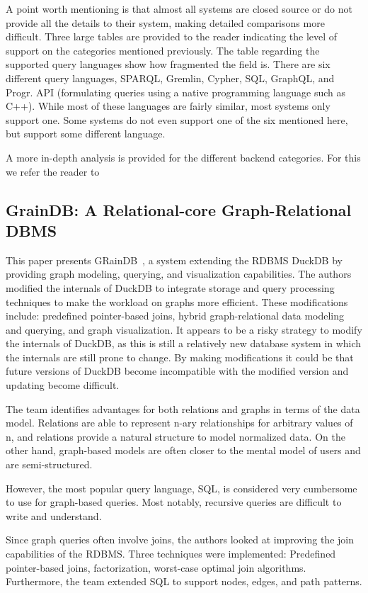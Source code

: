 A point worth mentioning is that almost all systems are closed source or do not provide all the details to their system, making detailed comparisons more difficult. Three large tables are provided to the reader indicating the level of support on the categories mentioned previously. The table regarding the supported query languages show how fragmented the field is. There are six different query languages, SPARQL, Gremlin, Cypher, SQL, GraphQL, and Progr. API (formulating queries using a native programming language such as C++). While most of these languages are fairly similar, most systems only support one. Some systems do not even support one of the six mentioned here, but support some different language.  

A more in-depth analysis is provided for the different backend categories. For this we refer the reader to 


\subsection{GrainDB: A Relational-core Graph-Relational DBMS}
This paper presents GRainDB~\cite{graindb}, a system extending the RDBMS DuckDB by providing graph modeling, querying, and visualization capabilities. The authors modified the internals of DuckDB  to integrate storage and query processing techniques  to make the workload on graphs more efficient. These modifications include: predefined pointer-based joins, hybrid graph-relational data modeling and querying, and graph visualization. It appears to be a risky strategy to modify the internals of DuckDB, as this is still a relatively new database system in which the internals are still prone to change. By making modifications it could be that future versions of DuckDB become incompatible with the modified version and updating become difficult. 

The team identifies advantages for both relations and graphs in terms of the data model. Relations are able to represent n-ary relationships for arbitrary values of n, and relations provide a natural structure to model normalized data. On the other hand, graph-based models are often closer to the mental model of users and are semi-structured.

However, the most popular query language, SQL, is considered very cumbersome to use for graph-based queries. Most notably, recursive queries are difficult to write and understand. 

Since graph queries often involve joins, the authors looked at improving the join capabilities of the RDBMS. Three techniques were implemented: Predefined pointer-based joins, factorization, worst-case optimal join algorithms. Furthermore, the team extended SQL to support nodes, edges, and path patterns. 

